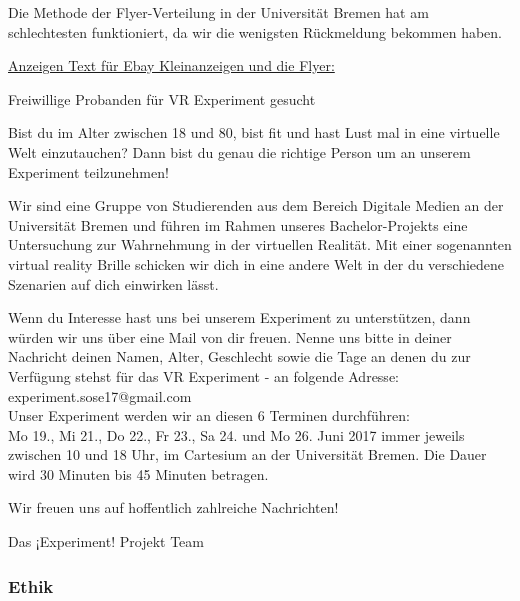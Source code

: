 \documentclass{Bericht}
\begin{document}
Die Methode der Flyer-Verteilung in der Universität Bremen hat am schlechtesten funktioniert, da wir die wenigsten Rückmeldung bekommen haben.

\underline{Anzeigen Text für Ebay Kleinanzeigen und die Flyer:}

Freiwillige Probanden für VR Experiment gesucht

Bist du im Alter zwischen 18 und 80, bist fit und hast Lust mal in eine virtuelle Welt einzutauchen? Dann bist du genau die richtige Person um an unserem Experiment teilzunehmen!

Wir sind eine Gruppe von Studierenden aus dem Bereich Digitale Medien an der Universität Bremen und führen im Rahmen unseres Bachelor-Projekts eine Untersuchung zur Wahrnehmung in der virtuellen Realität. Mit einer sogenannten \glqq virtual reality Brille\grqq{} schicken wir dich in eine andere Welt in der du verschiedene Szenarien auf dich einwirken lässt.

Wenn du Interesse hast uns bei unserem Experiment zu unterstützen, dann würden wir uns über eine Mail von dir freuen. Nenne uns bitte in deiner Nachricht deinen Namen, Alter, Geschlecht sowie die Tage an denen du zur Verfügung stehst für das VR Experiment - an folgende Adresse: experiment.sose17@gmail.com \\

Unser Experiment werden wir an diesen 6 Terminen durchführen: \\

Mo 19., Mi 21., Do 22., Fr 23., Sa 24. und Mo 26. Juni 2017 immer jeweils zwischen 10 und 18 Uhr, im Cartesium an der Universität Bremen. Die Dauer wird 30 Minuten bis 45 Minuten betragen.

Wir freuen uns auf hoffentlich zahlreiche Nachrichten!

Das ¡Experiment! Projekt Team

\subsubsection {Ethik}
\end{document}
